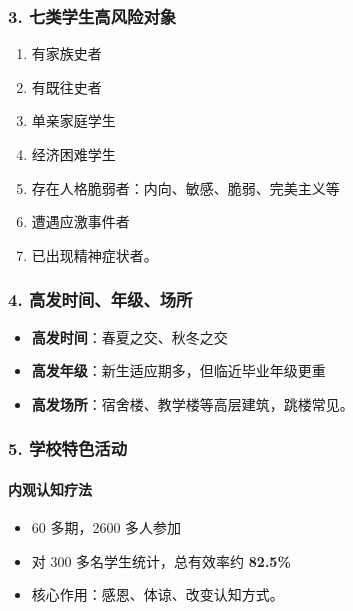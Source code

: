 \documentclass[
  a4paper,
]{ctexart}
\providecommand{\tightlist}{%
  \setlength{\itemsep}{0pt}\setlength{\parskip}{0pt}}
\begin{document}
\subsubsection{3.
七类学生高风险对象}\label{ux4e03ux7c7bux5b66ux751fux9ad8ux98ceux9669ux5bf9ux8c61}

\begin{enumerate}
\def\labelenumi{\arabic{enumi}.}
\tightlist
\item
  有家族史者
\item
  有既往史者
\item
  单亲家庭学生
\item
  经济困难学生
\item
  存在人格脆弱者：内向、敏感、脆弱、完美主义等
\item
  遭遇应激事件者
\item
  已出现精神症状者。
\end{enumerate}

\subsubsection{4.
高发时间、年级、场所}\label{ux9ad8ux53d1ux65f6ux95f4ux5e74ux7ea7ux573aux6240}

\begin{itemize}
\tightlist
\item
  \textbf{高发时间}：春夏之交、秋冬之交
\item
  \textbf{高发年级}：新生适应期多，但临近毕业年级更重
\item
  \textbf{高发场所}：宿舍楼、教学楼等高层建筑，跳楼常见。
\end{itemize}

\subsubsection{5.
学校特色活动}\label{ux5b66ux6821ux7279ux8272ux6d3bux52a8}

\paragraph{内观认知疗法}\label{ux5185ux89c2ux8ba4ux77e5ux7597ux6cd5}

\begin{itemize}
\tightlist
\item
  60 多期，2600 多人参加
\item
  对 300 多名学生统计，总有效率约 \textbf{82.5\%}
\item
  核心作用：感恩、体谅、改变认知方式。
\end{itemize}
\end{document}
